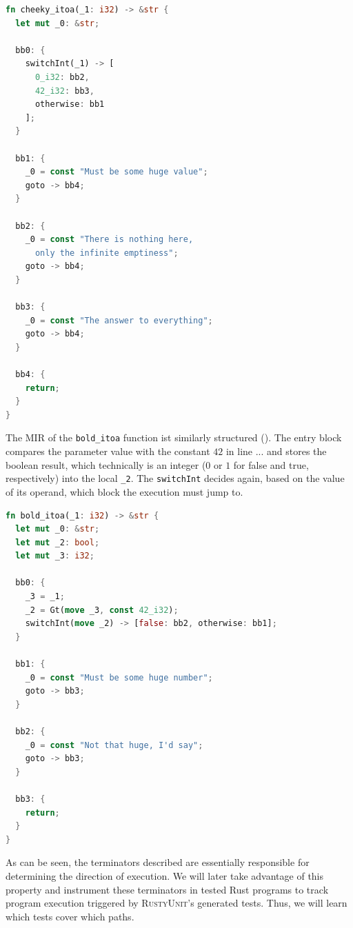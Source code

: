 \documentclass[paper=a4,%
  twoside,%
  BCOR4mm,%
  abstract=true,%
  toc=bibliography,%
  chapterprefix=true,%
  toc=bibliographynumbered,%
  open=right,%
  english,%
  pagesize=pdftex]{scrreprt}
\begin{document}
\begin{lstlisting}[language=Rust, style=boxed, caption={\ac{MIR} of the \lstinline{cheeky_itoa} function}, label=lst:mir-lowered-first]
fn cheeky_itoa(_1: i32) -> &str {
  let mut _0: &str;

  bb0: {
    switchInt(_1) -> [
      0_i32: bb2, 
      42_i32: bb3, 
      otherwise: bb1
    ]; 
  }

  bb1: {
    _0 = const "Must be some huge value"; 
    goto -> bb4;                  
  }

  bb2: {
    _0 = const "There is nothing here, 
      only the infinite emptiness"; 
    goto -> bb4;                   
  }

  bb3: {
    _0 = const "The answer to everything";
    goto -> bb4; 
  }

  bb4: {
    return;
  }
}
\end{lstlisting}

The \ac{MIR} of the \lstinline{bold_itoa} function ist similarly structured (). The entry block compares the parameter value with the constant $42$ in line ... and stores the boolean result, which technically is an integer ($0$ or $1$ for false and true, respectively) into the local \lstinline{_2}. The \lstinline{switchInt} decides again, based on the value of its operand, which block the execution must jump to.  

\begin{lstlisting}[language=Rust, style=boxed, caption={\ac{MIR} of the \lstinline{bold_itoa} function}, label=lst:mir-lowered-second]
fn bold_itoa(_1: i32) -> &str {
  let mut _0: &str;                    
  let mut _2: bool;                    
  let mut _3: i32;                     

  bb0: {
    _3 = _1;                         
    _2 = Gt(move _3, const 42_i32);  
    switchInt(move _2) -> [false: bb2, otherwise: bb1]; 
  }

  bb1: {
    _0 = const "Must be some huge number"; 
    goto -> bb3;
  }

  bb2: {
    _0 = const "Not that huge, I'd say";
    goto -> bb3;                     
  }

  bb3: {
    return;                          
  }
}
\end{lstlisting}

As can be seen, the terminators described are essentially responsible for determining the direction of execution. We will later take advantage of this property and instrument these terminators in tested Rust programs to track program execution triggered by \textsc{RustyUnit}'s generated tests. Thus, we will learn which tests cover which paths.
\end{document}
